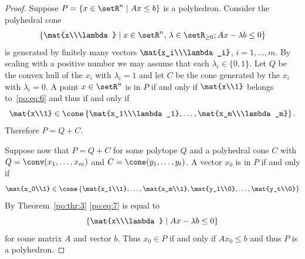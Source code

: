 \begin{proof}
  Suppose $P = \{ x \in \setR^n \mid Ax\leq b\}$ is a polyhedron. Consider the
  polyhedral cone 
  \begin{equation}
    \label{po:eq:6}
    \left\{\mat{x\\\lambda} \mid x \in \setR^n, \, \lambda \in \setR_{\geq0}; Ax -
      \lambda b\leq0\right\} 
  \end{equation}
  is generated by finitely many vectors $\mat{x_i\\\lambda_i}$,
  $i=1,\ldots,m$. By scaling with a positive number we may assume that
  each $\lambda_i\in \{0,1\}$.  Let $Q$ be the convex hull of the $x_i$ with
  $\lambda_i=1$ and let $C$ be the cone generated by the $x_i$ with
  $\lambda_i=0$. A point $x \in \setR^n$ is in $P$ if and only if $\mat{x\\1}$
  belongs to~\eqref{po:eq:6} and thus if and only if 
  \begin{displaymath}
    \mat{x\\1} \in
    \cone\left\{\mat{x_1\\\lambda_1},\ldots,\mat{x_m\\\lambda_m}\right\}. 
  \end{displaymath}
  Therefore $P = Q + C$. 


  Suppose now that $P = Q+C$ for some polytope $Q$ and a polyhedral
  cone $C$ with $Q = \conv(x_1,\ldots,x_m)$ and $C = \cone(y_1,\ldots,y_t)$. A
  vector $x_0$ is in $P$ if and only if 
  \begin{equation}
    \label{po:eq:7}
    \mat{x_0\\1} \in \cone\left\{\mat{x_1\\1},\ldots, \mat{x_m\\1},\mat{y_1\\0},\ldots,\mat{y_t\\0}     \right\}
  \end{equation}
By Theorem~\ref{po:thr:3} \eqref{po:eq:7} is equal to 
\begin{equation}
\label{po:eq:12}
  \left\{ \mat{x\\\lambda} \mid Ax - \lambda b \leq0\right\}
  \end{equation}
for some matrix $A$ and vector $b$.  Thus $x_0\in P$  if and only if
$Ax_0\leq b$ and thus $P$ is a polyhedron.

\end{proof}




